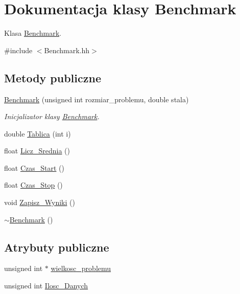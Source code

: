 \hypertarget{class_benchmark}{
\section{Dokumentacja klasy Benchmark}
\label{class_benchmark}
}


Klasa \hyperlink{class_benchmark}{Benchmark}.  




{\ttfamily \#include $<$Benchmark.hh$>$}

\subsection*{Metody publiczne}
\begin{DoxyCompactItemize}
\item 
\hyperlink{class_benchmark_a0d31c546243991bb9a740494dce9b2b1}{Benchmark} (unsigned int rozmiar\_\-problemu, double stala)
\begin{DoxyCompactList}\small\item\em Inicjalizator klasy \hyperlink{class_benchmark}{Benchmark}. \item\end{DoxyCompactList}\item 
double \hyperlink{class_benchmark_a15630af66f064ee79928ae58f74c87c0}{Tablica} (int i)
\item 
float \hyperlink{class_benchmark_a099a0e33f94c72bdc90006cd88bae3d7}{Licz\_\-Srednia} ()
\item 
float \hyperlink{class_benchmark_a52f1076c0e71389f8c962380e5354fed}{Czas\_\-Start} ()
\item 
float \hyperlink{class_benchmark_a178ddfabb8289612748453ecf0bfd600}{Czas\_\-Stop} ()
\item 
void \hyperlink{class_benchmark_a6b8ee09e9e44c458c007d27105463085}{Zapisz\_\-Wyniki} ()
\item 
\hyperlink{class_benchmark_a20476e07f09e2b20ed3e9a7f13a570e6}{$\sim$Benchmark} ()
\end{DoxyCompactItemize}
\subsection*{Atrybuty publiczne}
\begin{DoxyCompactItemize}
\item 
unsigned int $\ast$ \hyperlink{class_benchmark_aef4c89962e86bfe41f406c620e4b6ec6}{wielkosc\_\-problemu}
\item 
unsigned int \hyperlink{class_benchmark_a5f29a9983dd88241a17c4a9b2a86e9e1}{Ilosc\_\-Danych}
\end{DoxyCompactItemize}
